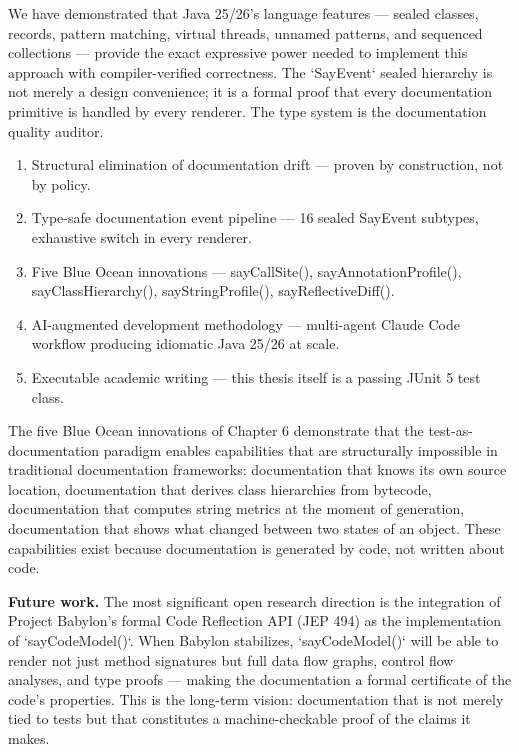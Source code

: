 \documentclass[11pt]{article}
\begin{document}
We have demonstrated that Java 25/26's language features — sealed classes, records, pattern matching, virtual threads, unnamed patterns, and sequenced collections — provide the exact expressive power needed to implement this approach with compiler-verified correctness. The `SayEvent` sealed hierarchy is not merely a design convenience; it is a formal proof that every documentation primitive is handled by every renderer. The type system is the documentation quality auditor.

\begin{enumerate}
\item Structural elimination of documentation drift — proven by construction, not by policy.
\item Type-safe documentation event pipeline — 16 sealed SayEvent subtypes, exhaustive switch in every renderer.
\item Five Blue Ocean innovations — sayCallSite(), sayAnnotationProfile(), sayClassHierarchy(), sayStringProfile(), sayReflectiveDiff().
\item AI-augmented development methodology — multi-agent Claude Code workflow producing idiomatic Java 25/26 at scale.
\item Executable academic writing — this thesis itself is a passing JUnit 5 test class.
\end{enumerate}


The five Blue Ocean innovations of Chapter 6 demonstrate that the test-as-documentation paradigm enables capabilities that are structurally impossible in traditional documentation frameworks: documentation that knows its own source location, documentation that derives class hierarchies from bytecode, documentation that computes string metrics at the moment of generation, documentation that shows what changed between two states of an object. These capabilities exist because documentation is generated by code, not written about code.

\textbf{Future work.} The most significant open research direction is the integration of Project Babylon's formal Code Reflection API (JEP 494) as the implementation of `sayCodeModel()`. When Babylon stabilizes, `sayCodeModel()` will be able to render not just method signatures but full data flow graphs, control flow analyses, and type proofs — making the documentation a formal certificate of the code's properties. This is the long-term vision: documentation that is not merely tied to tests but that constitutes a machine-checkable proof of the claims it makes.
\end{document}
